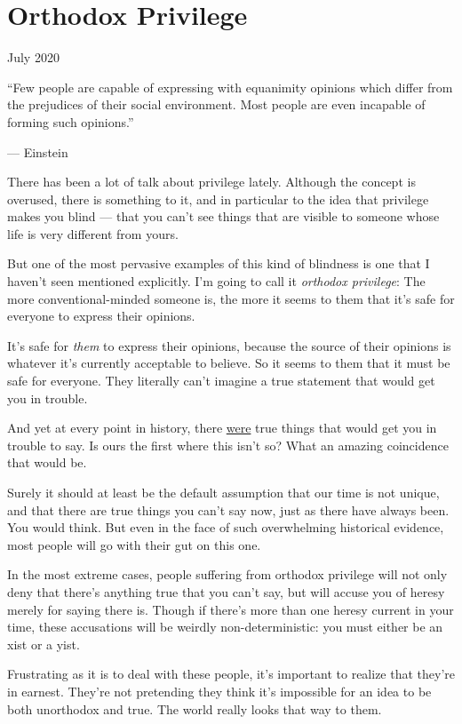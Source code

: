 \chapter{Orthodox Privilege}

July 2020

``Few people are capable of expressing with equanimity opinions which
differ from the prejudices of their social environment. Most people are
even incapable of forming such opinions.''

--- Einstein

There has been a lot of talk about privilege lately. Although the
concept is overused, there is something to it, and in particular to the
idea that privilege makes you blind --- that you can't see things that
are visible to someone whose life is very different from yours.

But one of the most pervasive examples of this kind of blindness is one
that I haven't seen mentioned explicitly. I'm going to call it
\emph{orthodox privilege}: The more conventional-minded someone is, the
more it seems to them that it's safe for everyone to express their
opinions.

It's safe for \emph{them} to express their opinions, because the source
of their opinions is whatever it's currently acceptable to believe. So
it seems to them that it must be safe for everyone. They literally can't
imagine a true statement that would get you in trouble.

And yet at every point in history, there \href{say.html}{were} true
things that would get you in trouble to say. Is ours the first where
this isn't so? What an amazing coincidence that would be.

Surely it should at least be the default assumption that our time is not
unique, and that there are true things you can't say now, just as there
have always been. You would think. But even in the face of such
overwhelming historical evidence, most people will go with their gut on
this one.

In the most extreme cases, people suffering from orthodox privilege will
not only deny that there's anything true that you can't say, but will
accuse you of heresy merely for saying there is. Though if there's more
than one heresy current in your time, these accusations will be weirdly
non-deterministic: you must either be an xist or a yist.

Frustrating as it is to deal with these people, it's important to
realize that they're in earnest. They're not pretending they think it's
impossible for an idea to be both unorthodox and true. The world really
looks that way to them.

